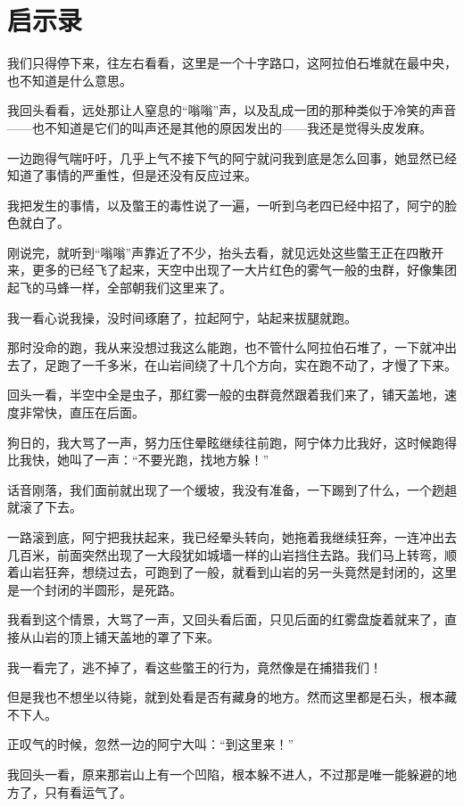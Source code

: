 \chapter{启示录}

我们只得停下来，往左右看看，这里是一个十字路口，这阿拉伯石堆就在最中央，也不知道是什么意思。

我回头看看，远处那让人窒息的“嗡嗡”声，以及乱成一团的那种类似于冷笑的声音——也不知道是它们的叫声还是其他的原因发出的——我还是觉得头皮发麻。

一边跑得气喘吁吁，几乎上气不接下气的阿宁就问我到底是怎么回事，她显然已经知道了事情的严重性，但是还没有反应过来。

我把发生的事情，以及蟞王的毒性说了一遍，一听到乌老四已经中招了，阿宁的脸色就白了。

刚说完，就听到“嗡嗡”声靠近了不少，抬头去看，就见远处这些蟞王正在四散开来，更多的已经飞了起来，天空中出现了一大片红色的雾气一般的虫群，好像集团起飞的马蜂一样，全部朝我们这里来了。

我一看心说我操，没时间琢磨了，拉起阿宁，站起来拔腿就跑。

那时没命的跑，我从来没想过我这么能跑，也不管什么阿拉伯石堆了，一下就冲出去了，足跑了一千多米，在山岩间绕了十几个方向，实在跑不动了，才慢了下来。

回头一看，半空中全是虫子，那红雾一般的虫群竟然跟着我们来了，铺天盖地，速度非常快，直压在后面。

狗日的，我大骂了一声，努力压住晕眩继续往前跑，阿宁体力比我好，这时候跑得比我快，她叫了一声：“不要光跑，找地方躲！”

话音刚落，我们面前就出现了一个缓坡，我没有准备，一下踢到了什么，一个趔趄就滚了下去。

一路滚到底，阿宁把我扶起来，我已经晕头转向，她拖着我继续狂奔，一连冲出去几百米，前面突然出现了一大段犹如城墙一样的山岩挡住去路。我们马上转弯，顺着山岩狂奔，想绕过去，可跑到了一般，就看到山岩的另一头竟然是封闭的，这里是一个封闭的半圆形，是死路。

我看到这个情景，大骂了一声，又回头看后面，只见后面的红雾盘旋着就来了，直接从山岩的顶上铺天盖地的罩了下来。

我一看完了，逃不掉了，看这些蟞王的行为，竟然像是在捕猎我们！

但是我也不想坐以待毙，就到处看是否有藏身的地方。然而这里都是石头，根本藏不下人。

正叹气的时候，忽然一边的阿宁大叫：“到这里来！”

我回头一看，原来那岩山上有一个凹陷，根本躲不进人，不过那是唯一能躲避的地方了，只有看运气了。

